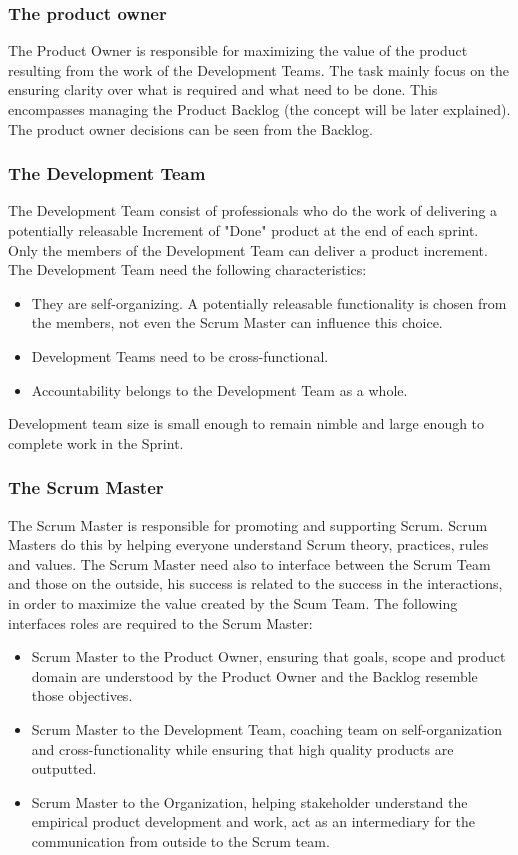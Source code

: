 \documentclass[../main.tex]{subfiles}
\begin{document}
\subsubsection{The product owner}
The Product Owner is responsible for maximizing the value of the product resulting from the work of the Development Teams. The task mainly focus on the ensuring clarity over what is required and what need to be done. This encompasses managing the Product Backlog (the concept will be later explained). The product owner decisions can be seen from the Backlog.\\
\subsubsection{The Development Team}
The Development Team consist of professionals who do the work of delivering a potentially releasable Increment of "Done" product at the end of each sprint. Only the members of the Development Team can deliver a product increment. \\
The Development Team need the following characteristics:
\begin{itemize}
    \item They are self-organizing. A potentially releasable functionality is chosen from the members, not even the Scrum Master can influence this choice. 
    \item Development Teams need to be cross-functional. 
    \item Accountability belongs to the Development Team as a whole. 
\end{itemize}
Development team size is small enough to remain nimble and large enough to complete work in the Sprint.
\subsubsection{The Scrum Master}
The Scrum Master is responsible for promoting and supporting Scrum. Scrum Masters do this by helping everyone understand Scrum theory, practices, rules and values. 
The Scrum Master need also to interface between the Scrum Team and those on the outside, his success is related to the success in the interactions, in order to maximize the value created by the Scum Team. The following interfaces roles are required to the Scrum Master:
\begin{itemize}
    \item Scrum Master to the Product Owner, ensuring that goals, scope and product domain are understood by the Product Owner and the Backlog resemble those objectives.
    \item Scrum Master to the Development Team, coaching team on self-organization and cross-functionality while ensuring that high quality products are outputted. 
    \item Scrum Master to the Organization, helping stakeholder understand the empirical product development and work, act as an intermediary for the communication from outside to the Scrum team. 
\end{itemize}
\end{document}
